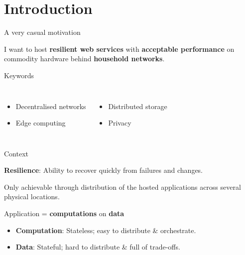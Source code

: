 \section{Introduction}

\begin{frame}{A very casual motivation}


\begin{center}
\Large
I want to host \textbf{resilient web services} with \textbf{acceptable performance} on commodity hardware behind \textbf{household networks}.
\end{center}
\vfill

\begin{block}{Keywords}
\begin{columns}
	\begin{itemize}
		\item Decentralised networks
		\item Edge computing
	\end{itemize}
	\begin{itemize}
		\item Distributed storage
		\item Privacy
	\end{itemize}
\end{columns}
\end{block}

\end{frame}

\begin{frame}{Context}

\textbf{Resilience}: Ability to recover quickly from failures and changes.
\vspace{1ex}

Only achievable through distribution of the hosted applications across several physical locations.
\vfill


\begin{block}{Application = \textbf{computations} on \textbf{data}}
\begin{itemize}
	\item \textbf{Computation}: Stateless; easy to distribute \& orchestrate.

	\item \textbf{Data}: Stateful; hard to distribute \& full of trade-offs.
\end{itemize}
\end{block}

\end{frame}


